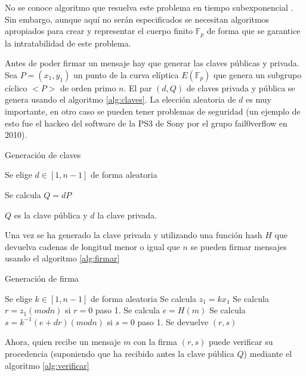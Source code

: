No se conoce algoritmo que resuelva este problema en tiempo subexponencial \citep{discrete_log}. Sin embargo, aunque aquí no serán especificados se necesitan algoritmos apropiados para crear y representar el cuerpo finito $\mathbb{F}_{p}$ de forma que se garantice la intratabilidad de este problema.

Antes de poder firmar un mensaje hay que generar las claves públicas y privada.
Sea $P = (x_{1},y_{1})$ un punto de la curva elíptica $E(\mathbb{F}_{p})$ que genera un subgrupo cíclico $<P>$ de orden primo $n$. El par $(d,Q)$ de claves privada y pública se genera usando el algoritmo \ref{alg:claves}. La elección aleatoria de $d$ es muy importante, en otro caso se pueden tener problemas de seguridad (un ejemplo de esto fue el hackeo del software de la PS3 de Sony por el grupo fail0verflow en 2010).
\begin{algorithm}
\caption{Generación de claves}\label{alg:claves}
\begin{algorithmic}[1]

\State Se elige $d \in [1, n-1]$ de forma aleatoria

\State Se calcula $Q=dP$

\State  $Q$ es la clave pública y $d$ la clave privada.
\end{algorithmic}
\end{algorithm}


Una vez se ha generado la clave privada y utilizando una función hash $H$ que devuelva cadenas de longitud menor o igual que $n$ se pueden firmar mensajes usando el algoritmo \ref{alg:firmar}
\begin{algorithm}[H]
\caption{Generación de firma}\label{alg:firmar}
\begin{algorithmic}[1]
\State Se elige $k \in [1, n-1]$ de forma aleatoria
\State Se calcula $z_{1} = kx_{1}$ 
\State Se calcula  $r = z_{1} (mod  n)$ si $r = 0$ paso 1.
\State Se calcula $e = H(m)$
\State Se calcula $s = k^{-1}(e + dr) (mod n)$ si $s = 0$ paso 1. 
\State Se devuelve $(r,s)$
\end{algorithmic}
\end{algorithm}

Ahora, quien recibe un mensaje $m$ con la firma $(r,s)$ puede verificar su procedencia (suponiendo que ha recibido antes la clave pública $Q$) mediante el algoritmo \ref{alg:verificar}

